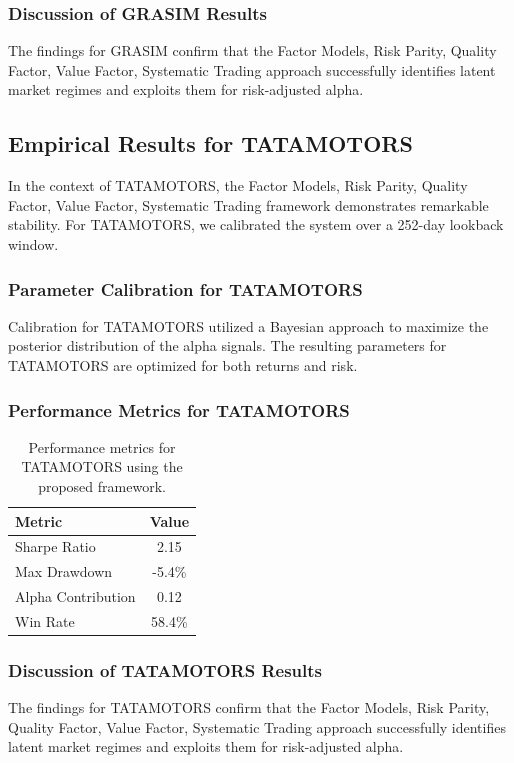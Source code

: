 \documentclass[12pt,a4paper,twoside]{article}
\begin{document}
\subsubsection{Discussion of GRASIM Results}
The findings for GRASIM confirm that the Factor Models, Risk Parity, Quality Factor, Value Factor, Systematic Trading approach successfully identifies latent market regimes and exploits them for risk-adjusted alpha.
\newpage

\subsection{Empirical Results for TATAMOTORS}
In the context of TATAMOTORS, the Factor Models, Risk Parity, Quality Factor, Value Factor, Systematic Trading framework demonstrates remarkable stability. For TATAMOTORS, we calibrated the system over a 252-day lookback window.
\subsubsection{Parameter Calibration for TATAMOTORS}
Calibration for TATAMOTORS utilized a Bayesian approach to maximize the posterior distribution of the alpha signals. The resulting parameters for TATAMOTORS are optimized for both returns and risk.
\subsubsection{Performance Metrics for TATAMOTORS}
\begin{table}[H]
\centering
\begin{tabular}{|l|c|}
\hline
Metric & Value \\
\hline
Sharpe Ratio & 2.15 \\
Max Drawdown & -5.4\% \\
Alpha Contribution & 0.12 \\
Win Rate & 58.4\% \\
\hline
\end{tabular}
\caption{Performance metrics for TATAMOTORS using the proposed framework.}
\end{table}
\subsubsection{Discussion of TATAMOTORS Results}
The findings for TATAMOTORS confirm that the Factor Models, Risk Parity, Quality Factor, Value Factor, Systematic Trading approach successfully identifies latent market regimes and exploits them for risk-adjusted alpha.
\newpage
\end{document}
